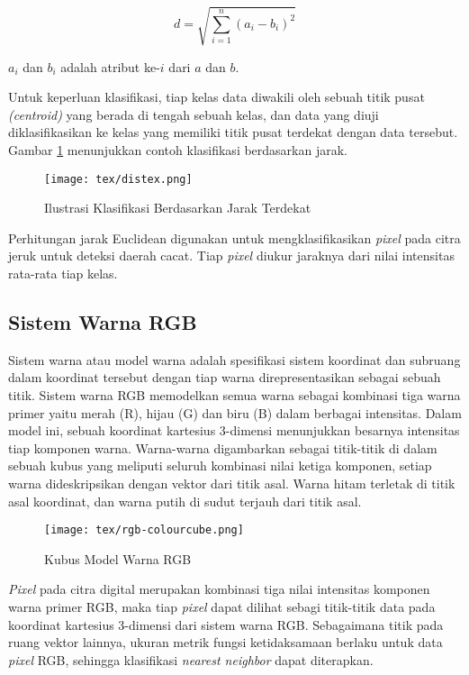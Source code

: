 \documentclass[laporan.tex]{subfiles}
\begin{document}
\begin{equation}
	d=\sqrt{\sum_{i=1}^n (a_i - b_i)^2}
\end{equation}

$a_i$ dan $b_i$ adalah atribut ke-$i$ dari $a$ dan $b$.

Untuk keperluan klasifikasi, tiap kelas data diwakili oleh sebuah titik pusat \emph{(centroid)} yang berada di tengah sebuah kelas, dan data yang diuji diklasifikasikan ke kelas yang memiliki titik pusat terdekat dengan data tersebut. Gambar \ref{fig:distex} menunjukkan contoh klasifikasi berdasarkan jarak.

\begin{figure}[h]
\centering
\texttt{[image: tex/distex.png]}
\caption{Ilustrasi Klasifikasi Berdasarkan Jarak Terdekat}
\label{fig:distex}
\end{figure}

Perhitungan jarak Euclidean digunakan untuk mengklasifikasikan \emph{pixel} pada citra jeruk untuk deteksi daerah cacat. Tiap \emph{pixel} diukur jaraknya dari nilai intensitas rata-rata tiap kelas.

\subsection{Sistem Warna RGB}
Sistem warna atau model warna adalah spesifikasi sistem koordinat dan subruang dalam koordinat tersebut dengan tiap warna direpresentasikan sebagai sebuah titik. Sistem warna RGB memodelkan semua warna sebagai kombinasi tiga warna primer yaitu merah (R), hijau (G) dan biru (B) dalam berbagai intensitas. Dalam model ini, sebuah koordinat kartesius 3-dimensi menunjukkan besarnya intensitas tiap komponen warna. Warna-warna digambarkan sebagai titik-titik di dalam sebuah kubus yang meliputi seluruh kombinasi nilai ketiga komponen, setiap warna dideskripsikan dengan vektor dari titik asal. Warna hitam terletak di titik asal koordinat, dan warna putih di sudut terjauh dari titik asal.

\begin{figure}[h]
\centering
\texttt{[image: tex/rgb-colourcube.png]}
\caption{Kubus Model Warna RGB}
\end{figure}

\emph{Pixel} pada citra digital merupakan kombinasi tiga nilai intensitas komponen warna primer RGB, maka tiap \emph{pixel} dapat dilihat sebagi titik-titik data pada koordinat kartesius 3-dimensi dari sistem warna RGB. Sebagaimana titik pada ruang vektor lainnya, ukuran metrik fungsi ketidaksamaan berlaku untuk data \emph{pixel} RGB, sehingga klasifikasi \emph{nearest neighbor} dapat diterapkan.
\end{document}
